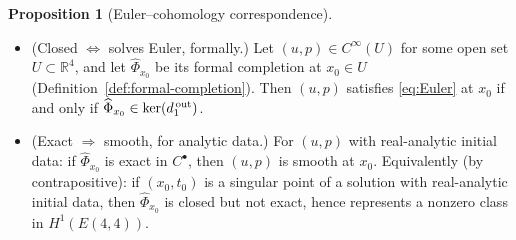 \documentclass[reqno,10pt]{amsart}
\theoremstyle{definition}
\newtheorem{prop}[subsubsection]{Proposition}
\begin{document}
\begin{prop}[Euler--cohomology correspondence]\label{prop:bridge}
\begin{itemize}
\item[(i)] \textup{(Closed $\Leftrightarrow$ solves Euler, formally.)}  Let
  $(u,p)\in C^\infty(U)$ for some open set $U\subset\mathbb{R}^4$, and
  let $\widehat{\Phi}_{x_0}$ be its formal completion at $x_0\in U$
  (Definition~\ref{def:formal-completion}).  Then $(u,p)$ satisfies
  \eqref{eq:Euler} at $x_0$ if and only if
  $\widehat{\Phi}_{x_0}\in\ker(d_1^{\,\textup{out}})$.
\item[(ii)] \textup{(Exact $\Rightarrow$ smooth, for analytic data.)}  For
  $(u,p)$ with real-analytic initial data: if $\widehat{\Phi}_{x_0}$ is
  exact in $C^\bullet$, then $(u,p)$ is smooth at $x_0$.  Equivalently
  (by contrapositive): if $(x_0,t_0)$ is a singular point of a solution
  with real-analytic initial data, then $\widehat{\Phi}_{x_0}$ is closed
  but not exact, hence represents a nonzero class in $H^1(E(4,4))$.
\end{itemize}
\end{prop}
\end{document}
